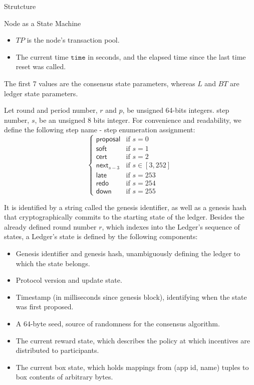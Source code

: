 \documentclass[10pt,a4paper]{article}
\begin{document}
\begin{section}{Strutcture}
\begin{subsection}{Node as a State Machine}
\begin{itemize}
    \item
    $TP$ is the node's transaction pool.

    \item 
    The current time $\mathtt{time}$ in seconds, and the elapsed time since the last
    time reset was called.
\end{itemize}
The first 7 values are the {\sf consensus state parameters},
whereas $L$ and $BT$ are {\sf ledger state parameters}.

Let round and period number, $r$ and $p$, be unsigned 64-bits integers. 
step number, $s$, be an unsigned 8 bits integer.
For convenience and readability, we define the following step name - step enumeration assignment:
\begin{equation}\label{table:s}
\left\{    
    \begin{array}{ll}
        \mathsf{proposal}&\mbox{if }s=0 \\
        \mathsf{soft}&\mbox{if }s=1 \\
        \mathsf{cert}&\mbox{if }s=2\\
        \mathsf{next}_{s-3}&\mbox{if }s\in [3, 252]\\
        \mathsf{late}&\mbox{if }s=253\\
        \mathsf{redo}&\mbox{if }s=254\\
        \mathsf{down}&\mbox{if }s=255
    \end{array}
\right.
\end{equation}

It is identified by a string called the genesis identifier, as well as a genesis hash that cryptographically 
commits to the starting state of the ledger.
Besides the already defined round number $r$, which indexes into the Ledger's sequence of states,
a Ledger's state is defined by the following components:
\begin{itemize}
    \item Genesis identifier and genesis hash, unambiguously defining the ledger 
    to which the state belongs.
    \item Protocol version and update state.
    \item Timestamp (in milliseconds since genesis block), identifying when the state was first proposed.
    \item A 64-byte seed, source of randomness for the consensus algorithm.
    \item The current reward state, which describes the policy at which incentives
    are distributed to participants.
    \item The current box state, which holds mappings from (app id, name) tuples
    to box contents of arbitrary bytes.
\end{itemize}


\end{subsection}
\end{section}
\end{document}
